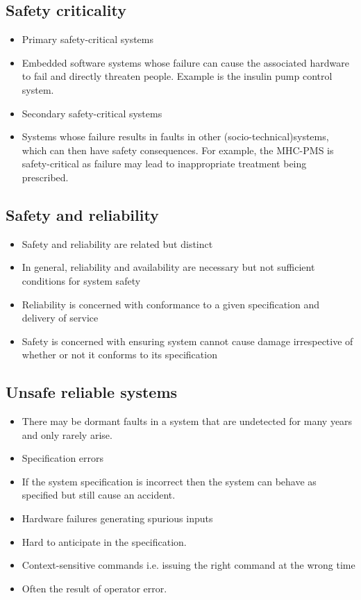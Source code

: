 \subsection{Safety criticality}
\begin{itemize}
\item Primary safety-critical systems

  \item Embedded software systems whose failure can cause the associated hardware to fail and directly threaten people. Example is the insulin pump control system.

\item Secondary safety-critical systems

  \item Systems whose failure results in faults in other (socio-technical)systems, which can then have safety consequences. For example, the MHC-PMS is safety-critical as failure may lead to inappropriate treatment being prescribed.

\end{itemize}
\subsection{Safety and reliability}
\begin{itemize}
\item Safety and reliability are related but distinct

  \item In general, reliability and availability are necessary but not sufficient conditions for system safety

\item Reliability is concerned with conformance to a given specification and delivery of service

\item Safety is concerned with ensuring system cannot cause damage irrespective of whether
or not it conforms to its specification
\end{itemize}
\subsection{Unsafe reliable systems}
\begin{itemize}
\item There may be dormant faults in a system that are undetected for many years and only rarely arise.

\item Specification errors

  \item If the system specification is incorrect then the system can behave as specified but still cause an accident.

\item Hardware failures generating spurious inputs   \item Hard to anticipate in the specification.
\item Context-sensitive commands i.e. issuing the right command at the wrong time

  \item Often the result of operator error.
\end{itemize}
\newpage
